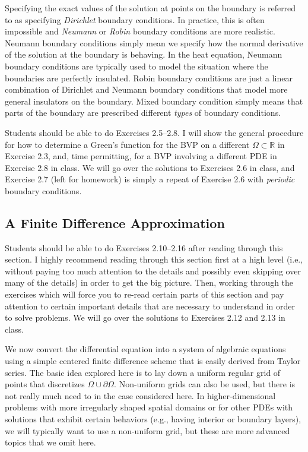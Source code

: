 \documentclass{amsart}
\theoremstyle{plain}
\theoremstyle{definition}
\theoremstyle{remark}
\theoremstyle{definition}
\numberwithin{equation}{section}
\numberwithin{equation}{section}
\begin{document}
Specifying the exact values of the solution at points on the boundary is referred to as specifying {\em Dirichlet} boundary conditions. 
In practice, this is often impossible and {\em Neumann} or {\em Robin} boundary conditions are more realistic.
Neumann boundary conditions simply mean we specify how the normal derivative of the solution at the boundary is behaving.
In the heat equation, Neumann boundary conditions are typically used to model the situation where the boundaries are perfectly insulated. 
Robin boundary conditions are just a linear combination of Dirichlet and Neumann boundary conditions that model more general insulators on the boundary. 
Mixed boundary condition simply means that parts of the boundary are prescribed different {\em types} of boundary conditions.

Students should be able to do Exercises 2.5--2.8. 
I will show the general procedure for how to determine a Green's function for the BVP on a different $\Omega\subset\mathbb{R}$ in Exercise 2.3, and, time permitting, for a BVP involving a different PDE in Exercise 2.8 in class.
We will go over the solutions to Exercises 2.6 in class, and Exercise 2.7 (left for homework) is simply a repeat of Exercise 2.6 with {\em periodic} boundary conditions. 


\subsection{A Finite Difference Approximation}

Students should be able to do Exercises 2.10--2.16 after reading through this section. 
I highly recommend reading through this section first at a high level (i.e., without paying too much attention to the details and possibly even skipping over many of the details) in order to get the big picture. 
Then, working through the exercises which will force you to re-read certain parts of this section and pay attention to certain important details that are necessary to understand in order to solve problems. 
We will go over the solutions to Exercises 2.12 and 2.13 in class. 

We now convert the differential equation into a system of algebraic equations using a simple centered finite difference scheme that is easily derived from Taylor series.
The basic idea explored here is to lay down a uniform regular grid of points that discretizes $\Omega\cup\partial\Omega$.
Non-uniform grids can also be used, but there is not really much need to in the case considered here.
In higher-dimensional problems with more irregularly shaped spatial domains or for other PDEs with solutions that exhibit certain behaviors (e.g., having interior or boundary layers), we will typically want to use a non-uniform grid, but these are more advanced topics that we omit here.
\end{document}
